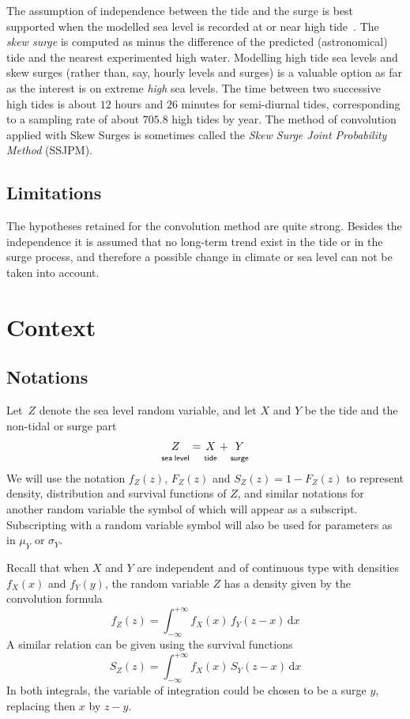 \documentclass[11pt,a4paper]{report}\usepackage[]{graphicx}\usepackage[]{color}
\begin{document}
The assumption of independence between the tide and the surge is best
supported when the modelled sea level is recorded at or near high
tide~\cite{COLESBAYES}. The  \textit{skew surge} is
computed as minus the difference of the predicted (astronomical) tide
and the nearest experimented high water. Modelling high tide sea levels
and skew surges (rather than, say,  hourly levels and surges) is a valuable
option as far as the interest is on extreme \textit{high} sea
levels. The time between two successive high tides is about $12$ hours and $26$
minutes for semi-diurnal tides, corresponding to a sampling rate of
about $705.8$ high tides by year. The method of convolution applied
with Skew Surges is sometimes called the \textit{Skew Surge Joint Probability
Method} (SSJPM).

\subsection{Limitations}
The hypotheses retained for the convolution method are quite strong.  Besides
the independence it is assumed that no long-term trend exist in the tide or in
the surge process, and therefore a possible change in climate or sea level can
not be taken into account.


\section{Context}
\subsection{Notations}
Let~$Z$ denote the sea level random variable, and 
let $X$ and $Y$ be the tide and the non-tidal or surge part
$$ 
   \underset{\mathsf{sea\:level}\rule{0pt}{8pt}}{Z}
   = \underset{\mathsf{tide}\rule{0pt}{8pt}}{X} 
   + \underset{\mathsf{surge}\rule{0pt}{8pt}}{Y}
$$
We will use the notation $f_Z(z)$, $F_Z(z)$ and $S_Z(z)=1-F_Z(z)$ to represent
density, distribution and survival functions of $Z$, and similar notations for
another random variable the symbol of which will appear as a subscript. Subscripting
with a random variable symbol will also be used for parameters as in $\mu_Y$ 
or $\sigma_Y$.

Recall that when $X$ and $Y$ are independent and of continuous type
with densities $f_X(x)$ and $f_Y(y)$, the random variable $Z$ has a
density given by the convolution formula 
\begin{equation}
  \label{eq:CONVDENS}
   f_Z(z) = \int_{-\infty}^{+\infty}
   f_X(x) \,f_Y(z-x) \,\mathrm{d}x
\end{equation}
A similar relation can be given using the survival functions 
\begin{equation}
  \label{eq:CONVSURV}
   S_Z(z) = \int_{-\infty}^{+\infty}
   f_X(x) \,S_Y(z-x) \,\mathrm{d}x
 \end{equation}
In both integrals, the variable of integration could be chosen 
to be a surge $y$, replacing then $x$ by  $z-y$.
\end{document}
